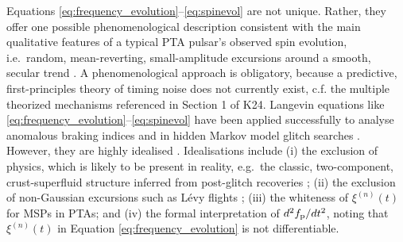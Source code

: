\documentclass[fleqn,usenatbib,useAMS]{mnras}
\begin{document}
Equations \eqref{eq:frequency_evolution}--\eqref{eq:spinevol} are not unique. Rather, they offer one possible phenomenological description consistent with the main qualitative features of a typical PTA pulsar's observed spin evolution, i.e.\ random, mean-reverting, small-amplitude excursions around a smooth, secular trend \citep{NANOgrav2023,EPTA2023,Zic2023arXiv230616230Z}. A phenomenological approach is obligatory, because a predictive, first-principles theory of timing noise does not currently exist, c.f. the multiple theorized mechanisms referenced in Section 1 of K24. Langevin equations like \eqref{eq:frequency_evolution}--\eqref{eq:spinevol} have been applied successfully to analyse anomalous braking indices \citep{Vargas} and in hidden Markov model glitch searches \citep{Melatos2020ApJ...896...78M,Lower2021MNRAS.508.3251L,Dunn2022,Dunn2023MNRAS.522.5469D}. However, they are highly idealised \citep{Meyers2021,Myers2021MNRAS.502.3113M,2023MNRAS.520.2813A,Vargas}. Idealisations include (i) the exclusion of physics, which is likely to be present in reality, e.g.\ the classic, two-component, crust-superfluid structure inferred from post-glitch recoveries \citep{Baym1969,vanEysden,Alpar2017MNRAS.471.4827G,Myers2021MNRAS.502.3113M,Meyers2021}; (ii) the exclusion of non-Gaussian excursions such as L\'{e}vy flights \citep{Sornette2004}; (iii) the whiteness of $\xi^{(n)}(t)$ for MSPs in PTAs; and (iv) the formal interpretation of $d^2 f_{\rm p} / dt^2$, noting that $\xi^{(n)}(t)$ in Equation \eqref{eq:frequency_evolution} is not differentiable.
\end{document}
